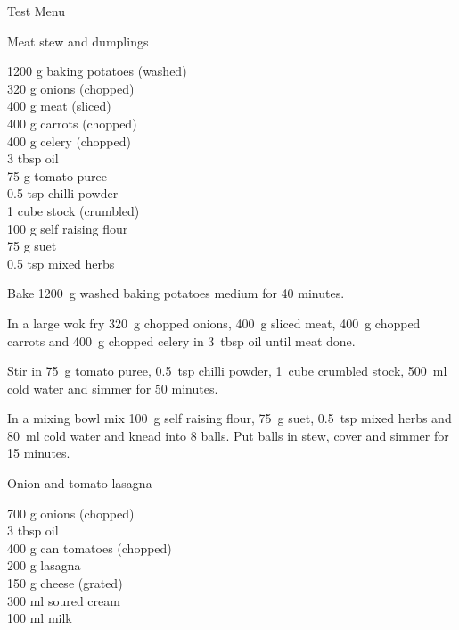 \begin{menu}{Test Menu}
    \begin{recipe}{2}{Meat stew and dumplings}%
    
		\begin{ingredients}
		1200 g baking potatoes (washed) \\
	320 g onions (chopped) \\
	400 g meat (sliced) \\
	400 g carrots (chopped) \\
	400 g celery (chopped) \\
	3 tbsp oil  \\
	75 g tomato puree  \\
	0.5 tsp chilli powder  \\
	1 cube stock (crumbled) \\
	100 g self raising flour  \\
	75 g suet  \\
	0.5 tsp mixed herbs  \\
	
		\end{ingredients}
	
	
	
    \begin{instructions}
    \item 
      Bake 1200~g washed baking potatoes
      medium for 40 minutes.
    \item 
        In a large wok fry
        320~g chopped onions,
        400~g sliced meat,
        400~g chopped carrots
        and
        400~g chopped celery
        in
        3~tbsp  oil
        until meat done.
      \item 
        Stir in
        75~g  tomato puree,
        0.5~tsp  chilli powder,
        1~cube crumbled stock,
        500~ml  cold water
        and simmer for 50 minutes.
      \item 
        In a mixing bowl mix
        100~g  self raising flour,
        75~g  suet,
        0.5~tsp  mixed herbs
        and
        80~ml  cold water
        and knead into 8 balls.
        Put balls in stew, cover and
        simmer for 15 minutes.
      
    \end{instructions}
    \end{recipe}%
  
    \begin{recipe}{2}{Onion and tomato lasagna}%
    
		\begin{ingredients}
		700 g onions (chopped) \\
	3 tbsp oil  \\
	400 g can tomatoes (chopped) \\
	200 g lasagna  \\
	150 g cheese (grated) \\
	300 ml soured cream  \\
	100 ml milk  \\
	

\end{ingredients}
\end{recipe}
\end{menu}
